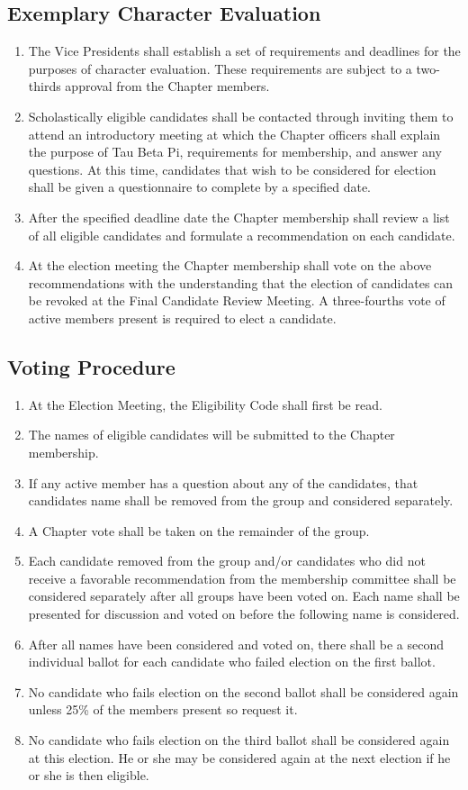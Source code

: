 \documentclass{article}
\begin{document}
	\subsection{Exemplary Character Evaluation}
	\begin{enumerate}[\indent (a)]
		\item The Vice Presidents shall establish a set of requirements and deadlines for the purposes of character evaluation. These requirements are subject to a two-thirds approval from the Chapter members.
		\item Scholastically eligible candidates shall be contacted through inviting them to attend an introductory meeting at which the Chapter officers shall explain the purpose of Tau Beta Pi, requirements for membership, and answer any questions. At this time, candidates that wish to be considered for election shall be given a questionnaire to complete by a specified date.
		\item After the specified deadline date the Chapter membership shall review a list of all eligible candidates and formulate a recommendation on each candidate.
		\item At the election meeting the Chapter membership shall vote on the above recommendations with the understanding that the election of candidates can be revoked at the Final Candidate Review Meeting. A three-fourths vote of active members present is required to elect a candidate.
	\end{enumerate}
	
	\subsection{Voting Procedure}
	\begin{enumerate}[\indent (a)]
		\item At the Election Meeting, the Eligibility Code shall first be read.
		\item The names of eligible candidates will be submitted to the Chapter membership.
		\item If any active member has a question about any of the candidates, that candidate\textquotesingle s name shall be removed from the group and considered separately.
		\item A Chapter vote shall be taken on the remainder of the group.
		\item Each candidate removed from the group and/or candidates who did not receive a favorable recommendation from the membership committee shall be considered separately after all groups have been voted on. Each name shall be presented for discussion and voted on before the following name is considered.
		\item After all names have been considered and voted on, there shall be a second individual ballot for each candidate who failed election on the first ballot.
		\item No candidate who fails election on the second ballot shall be considered again unless 25\% of the members present so request it.
		\item No candidate who fails election on the third ballot shall be considered again at this election. He or she may be considered again at the next election if he or she is then eligible.
	\end{enumerate}
\end{document}
